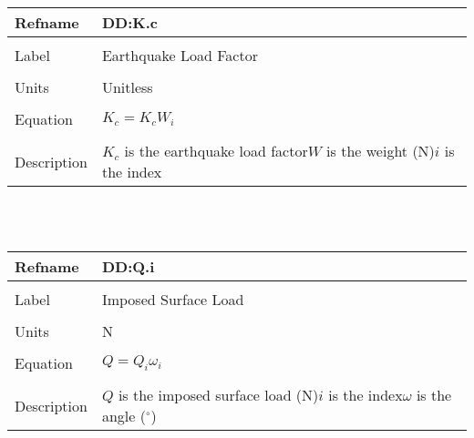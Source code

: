 \documentclass[12pt]{article}
\begin{document}
\noindent \begin{minipage}{\textwidth}
\begin{tabular}{p{} p{}}
\toprule \textbf{Refname} & \textbf{DD:K.c}
\label{DD:K.c}
\\ \midrule \\
Label & Earthquake Load Factor
\\ \midrule \\
Units & Unitless
\\ \midrule \\
Equation & ${K_{c}}={K_{c}} W_{i}$
\\ \midrule \\
Description & ${K_{c}}$ is the earthquake load factor\newline$W$ is the weight (N)\newline$i$ is the index
\\ \bottomrule \end{tabular}
\end{minipage}\\
~\newline
\noindent \begin{minipage}{\textwidth}
\begin{tabular}{p{} p{}}
\toprule \textbf{Refname} & \textbf{DD:Q.i}
\label{DD:Q.i}
\\ \midrule \\
Label & Imposed Surface Load
\\ \midrule \\
Units & N
\\ \midrule \\
Equation & $Q=Q_{i} ω_{i}$
\\ \midrule \\
Description & $Q$ is the imposed surface load (N)\newline$i$ is the index\newline$ω$ is the angle (${}^{\circ}$)
\\ \bottomrule \end{tabular}
\end{minipage}\\
~\newline
\end{document}
